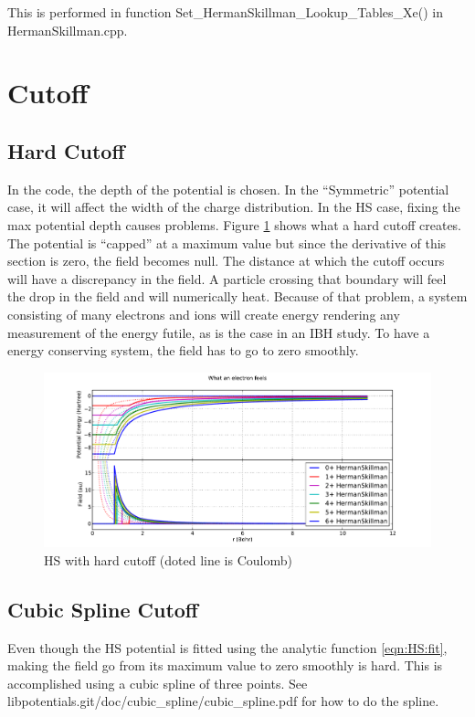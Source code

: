 \documentclass[12pt,letterpaper]{article}
\begin{document}
This is performed in function Set\_HermanSkillman\_Lookup\_Tables\_Xe() in HermanSkillman.cpp.




\section{Cutoff}
\subsection{Hard Cutoff}
In the code, the depth of the potential is chosen. In the ``Symmetric'' potential case, it will affect the width of the charge distribution. In the HS case, fixing the max potential depth causes problems.
Figure \ref{fig:hs:hard_cutoff} shows what a hard cutoff creates. The potential is ``capped'' at a maximum value but since the derivative of this section is zero, the field becomes null. The distance
at which the cutoff occurs will have a discrepancy in the field. A particle crossing that boundary
will feel the drop in the field and will numerically heat. Because of that problem, a system
consisting of many electrons and ions will create energy rendering any measurement of the
energy futile, as is the case in an IBH study. To have a energy conserving system, the field has
to go to zero smoothly.

\begin{figure}
\includegraphics[width=0.98\columnwidth]{hs_3_hard_cutoff}
\caption{\label{fig:hs:hard_cutoff}HS with hard cutoff (doted line is Coulomb)}
\end{figure}

\subsection{Cubic Spline Cutoff}
Even though the HS potential is fitted using the analytic function \eqref{eqn:HS:fit}, making the field go from its maximum value to zero smoothly is hard. This is accomplished using a cubic spline of three points. See libpotentials.git/doc/cubic\_spline/cubic\_spline.pdf for how to do the spline.
\end{document}
